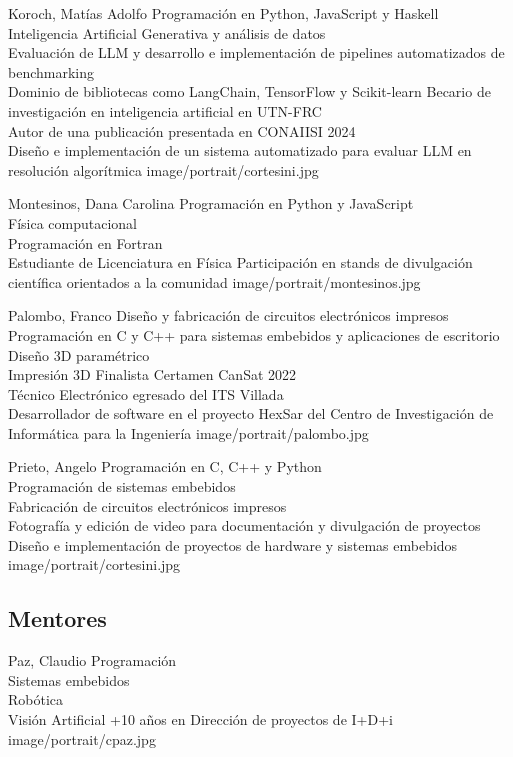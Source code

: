 \presentacion
  {Koroch, Matías Adolfo}
  {Programación en Python, JavaScript y Haskell\\Inteligencia Artificial Generativa y análisis de datos\\Evaluación de LLM y desarrollo e implementación de pipelines automatizados de benchmarking\\Dominio de bibliotecas como LangChain, TensorFlow y Scikit-learn}
  {Becario de investigación en inteligencia artificial en UTN-FRC\\Autor de una publicación presentada en CONAIISI 2024\\Diseño e implementación de un sistema automatizado para evaluar LLM en resolución algorítmica}
  {image/portrait/cortesini.jpg}

\presentacion
  {Montesinos, Dana Carolina}
  {Programación en Python y JavaScript\\Física computacional\\Programación en Fortran\\Estudiante de Licenciatura en Física}
  {Participación en stands de divulgación científica orientados a la comunidad}
  {image/portrait/montesinos.jpg}

\presentacion
  {Palombo, Franco}
  {Diseño y fabricación de circuitos electrónicos impresos\\Programación en C y C++ para sistemas embebidos y aplicaciones de escritorio\\Diseño 3D paramétrico\\Impresión 3D}
  {Finalista Certamen CanSat 2022\\Técnico Electrónico egresado del ITS Villada\\Desarrollador de software en el proyecto HexSar del Centro de Investigación de Informática para la Ingeniería}
  {image/portrait/palombo.jpg}

\presentacion
  {Prieto, Angelo}
  {Programación en C, C++ y Python\\Programación de sistemas embebidos\\Fabricación de circuitos electrónicos impresos\\Fotografía y edición de video para documentación y divulgación de proyectos}
  {Diseño e implementación de proyectos de hardware y sistemas embebidos}
  {image/portrait/cortesini.jpg}

\subsection{Mentores}
\presentacion
  {Paz, Claudio}
  {Programación\\Sistemas embebidos\\Robótica\\Visión Artificial}
  {+10 años en Dirección de proyectos de I+D+i}
  {image/portrait/cpaz.jpg}

